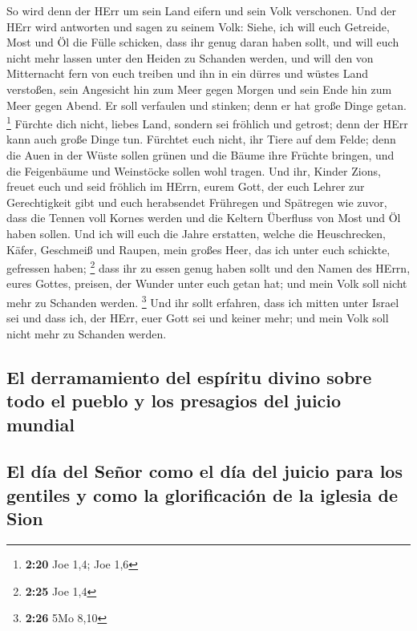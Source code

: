 So wird denn der HErr um sein Land eifern und sein Volk
verschonen.  Und der HErr wird antworten und sagen zu
seinem Volk: Siehe, ich will euch Getreide, Most und Öl die Fülle
schicken, dass ihr genug daran haben sollt, und will euch nicht mehr
lassen unter den Heiden zu Schanden werden,  und will den
von Mitternacht fern von euch treiben und ihn in ein dürres und wüstes
Land verstoßen, sein Angesicht hin zum Meer gegen Morgen und sein Ende
hin zum Meer gegen Abend. Er soll verfaulen und stinken; denn er hat
große Dinge getan. \footnote{\textbf{2:20} Joe 1,4; Joe 1,6}
 Fürchte dich nicht, liebes Land, sondern sei fröhlich
und getrost; denn der HErr kann auch große Dinge tun. 
Fürchtet euch nicht, ihr Tiere auf dem Felde; denn die Auen in der Wüste
sollen grünen und die Bäume ihre Früchte bringen, und die Feigenbäume
und Weinstöcke sollen wohl tragen.  Und ihr, Kinder
Zions, freuet euch und seid fröhlich im HErrn, eurem Gott, der euch
Lehrer zur Gerechtigkeit gibt und euch herabsendet Frühregen und
Spätregen wie zuvor,  dass die Tennen voll Kornes werden
und die Keltern Überfluss von Most und Öl haben sollen. 
Und ich will euch die Jahre erstatten, welche die Heuschrecken, Käfer,
Geschmeiß und Raupen, mein großes Heer, das ich unter euch schickte,
gefressen haben; \footnote{\textbf{2:25} Joe 1,4}  dass
ihr zu essen genug haben sollt und den Namen des HErrn, eures Gottes,
preisen, der Wunder unter euch getan hat; und mein Volk soll nicht mehr
zu Schanden werden. \footnote{\textbf{2:26} 5Mo 8,10} 
Und ihr sollt erfahren, dass ich mitten unter Israel sei und dass ich,
der HErr, euer Gott sei und keiner mehr; und mein Volk soll nicht mehr
zu Schanden werden.

\hypertarget{el-derramamiento-del-espuxedritu-divino-sobre-todo-el-pueblo-y-los-presagios-del-juicio-mundial}{%
\subsection{El derramamiento del espíritu divino sobre todo el pueblo y
los presagios del juicio
mundial}\label{el-derramamiento-del-espuxedritu-divino-sobre-todo-el-pueblo-y-los-presagios-del-juicio-mundial}}

\hypertarget{el-duxeda-del-seuxf1or-como-el-duxeda-del-juicio-para-los-gentiles-y-como-la-glorificaciuxf3n-de-la-iglesia-de-sion}{%
\subsection{El día del Señor como el día del juicio para los gentiles y
como la glorificación de la iglesia de
Sion}\label{el-duxeda-del-seuxf1or-como-el-duxeda-del-juicio-para-los-gentiles-y-como-la-glorificaciuxf3n-de-la-iglesia-de-sion}}


